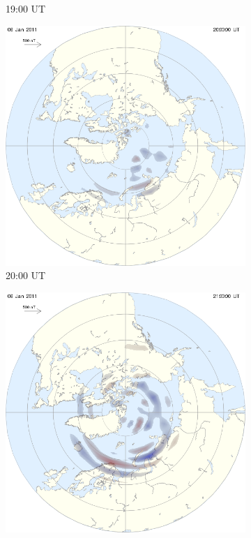 \documentclass[10pt,a4paper]{article}
\begin{document}
\begin{figure}[h]
\begin{subfigure}{0.3\textwidth}
	\caption{19:00 UT \label{amp19}}
\end{subfigure}
\begin{subfigure}{0.3\textwidth}
\centering
	\includegraphics[width=\textwidth]{ampere2.png}
	\caption{ 20:00 UT \label{amp20}}
\end{subfigure}
\begin{subfigure}{0.3\textwidth}
\centering
	\includegraphics[width=\textwidth]{ampere3.png}

\end{subfigure}
\end{figure}
\end{document}
